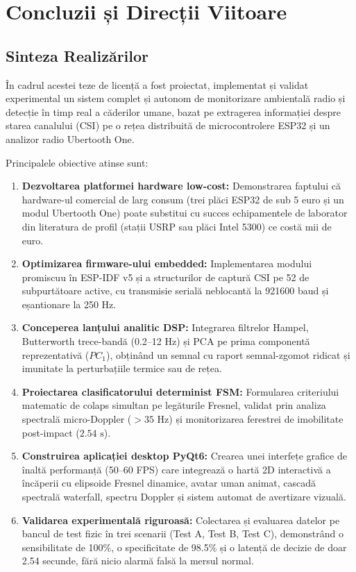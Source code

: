 \chapter{Concluzii și Direcții Viitoare}
\label{chap:concluzii}

\section{Sinteza Realizărilor}
În cadrul acestei teze de licență a fost proiectat, implementat și validat experimental un sistem complet și autonom de monitorizare ambientală radio și detecție în timp real a căderilor umane, bazat pe extragerea informației despre starea canalului (CSI) pe o rețea distribuită de microcontrolere ESP32 și un analizor radio Ubertooth One.

Principalele obiective atinse sunt:
\begin{enumerate}
    \item \textbf{Dezvoltarea platformei hardware low-cost:} Demonstrarea faptului că hardware-ul comercial de larg consum (trei plăci ESP32 de sub 5 euro și un modul Ubertooth One) poate substitui cu succes echipamentele de laborator din literatura de profil (stații USRP sau plăci Intel 5300) ce costă mii de euro.
    \item \textbf{Optimizarea firmware-ului embedded:} Implementarea modului promiscuu în ESP-IDF v5 și a structurilor de captură CSI pe 52 de subpurtătoare active, cu transmisie serială neblocantă la 921600 baud și eșantionare la 250 Hz.
    \item \textbf{Conceperea lanțului analitic DSP:} Integrarea filtrelor Hampel, Butterworth trece-bandă (0.2--12 Hz) și PCA pe prima componentă reprezentativă ($PC_1$), obținând un semnal cu raport semnal-zgomot ridicat și imunitate la perturbațiile termice sau de rețea.
    \item \textbf{Proiectarea clasificatorului determinist FSM:} Formularea criteriului matematic de colaps simultan pe legăturile Fresnel, validat prin analiza spectrală micro-Doppler ($>35\text{ Hz}$) și monitorizarea ferestrei de imobilitate post-impact ($2.54\text{ s}$).
    \item \textbf{Construirea aplicației desktop PyQt6:} Crearea unei interfețe grafice de înaltă performanță (50--60 FPS) care integrează o hartă 2D interactivă a încăperii cu elipsoide Fresnel dinamice, avatar uman animat, cascadă spectrală waterfall, spectru Doppler și sistem automat de avertizare vizuală.
    \item \textbf{Validarea experimentală riguroasă:} Colectarea și evaluarea datelor pe bancul de test fizic în trei scenarii (Test A, Test B, Test C), demonstrând o sensibilitate de 100\%, o specificitate de 98.5\% și o latență de decizie de doar 2.54 secunde, fără nicio alarmă falsă la mersul normal.
\end{enumerate}

